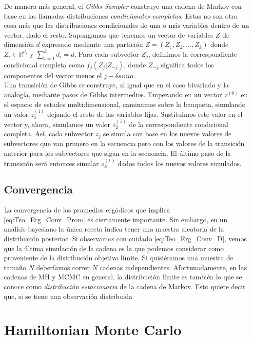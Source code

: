 De manera más general, el \textit{Gibbs Sampler} construye una cadena de Markov con base en las llamadas distribuciones \textit{condicionales completas}. Estas no son otra cosa más que las distribuciones condicionales de una o más variables dentro de un vector, dado el resto. Supongamos que tenemos un vector de variables $Z$ de dimensión $d$ expresado mediante una partición $Z = (Z_1, Z_2, \dots, Z_k)$ donde $Z_i \in \mathbb{R}^{d_i}$ y $\sum\limits_{i=1}^k d_i = d$. Para cada subvector $Z_j$, definimos la correspondiente condicional completa como $f_j(Z_j|Z_{-j})$, donde $Z_{-j}$ significa todos los componentes del vector menos el $j-ésimo$.\\

Una transición de Gibbs se construye, al igual que en el caso bivariado y la analogía, mediante pasos de Gibbs intermedios. Empezando en un vector $z^{(0)}$ en el espacio de estados multidimensional, caminamos sobre la banqueta, simulando un valor $z_1^{(1)}$ dejando el resto de las variables fijas. Sustituimos este valor en el vector y, ahora, simulamos un valor $z_2^{(1)}$ de la correspondiente condicional completa. Así, cada subvector $z_j$ se simula con base en los nuevos valores de subvectores que van primero en la secuencia pero con los valores de la transición anterior para los subvectores que sigan en la secuencia. El último paso de la transición será entonces simular $z_k^{(1)}$ dados todos los nuevos valores simulados. 


\subsection{Convergencia}

La convergencia de los promedios ergódicos que implica \eqref{eq:Teo_Erg_Conv_Prom} es ciertamente importante. Sin embargo, en un análisis bayesiano la única receta indica tener una muestra aleatoria de la distribución posterior. Si observamos con cuidado \eqref{eq:Teo_Erg_Conv_D}, vemos que la última simulación de la cadena es la que podemos considerar como proveniente de la distribución objetivo límite. Si quisiéramos una muestra de tamaño $N$ deberíamos correr $N$ cadenas independientes. Afortunadamente, en las cadenas de MH y MCMC en general, la distribución límite es también lo que se conoce como \textit{distribución estacionaria} de la cadena de Markov. Esto quiere decir que, si se tiene una observación distribuida\\

\section{Hamiltonian Monte Carlo}